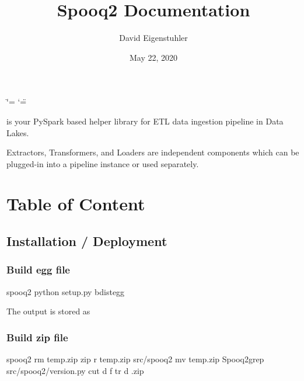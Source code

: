\documentclass[a4paper,10pt, twoside,english]{sphinxmanual}
\title{Spooq2 Documentation}
\date{May 22, 2020}
\author{David Eigenstuhler}
\begin{document}
\ifdefined\shorthandoff
  \ifnum\catcode`\=\string=\active\shorthandoff{=}\fi
  \ifnum\catcode`\"=\active{}\fi
\fi

\pagestyle{empty}
\sphinxmaketitle
\pagestyle{plain}
\sphinxtableofcontents
\pagestyle{normal}
\label{\detokenize{index::doc}}


 is your PySpark based helper library for ETL data ingestion pipeline in Data Lakes.

Extractors, Transformers, and Loaders are independent components which can be plugged-in into a pipeline instance or used separately.


\chapter{Table of Content}
\label{\detokenize{index:table-of-content}}

\section{Installation / Deployment}
\label{\detokenize{installation:installation-deployment}}\label{\detokenize{installation::doc}}

\subsection{Build egg file}
\label{\detokenize{installation:build-egg-file}}
\begin{sphinxVerbatim}[commandchars=\\\{\}]
\PYGZdl{}  spooq2
\PYGZdl{} python setup.py bdist\PYGZus{}egg
\end{sphinxVerbatim}

The output is stored as 


\subsection{Build zip file}
\label{\detokenize{installation:build-zip-file}}
\begin{sphinxVerbatim}[commandchars=\\\{\}]
\PYGZdl{}  spooq2
\PYGZdl{} rm temp.zip
\PYGZdl{} zip \PYGZhy{}r temp.zip src/spooq2
\PYGZdl{} mv temp.zip Spooq2\PYGZus{}grep  src/spooq2/\PYGZus{}version.py  
    cut \PYGZhy{}d  \PYGZhy{}f   tr \PYGZhy{}d .zip
\end{sphinxVerbatim}
\end{document}
